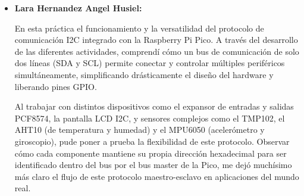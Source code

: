 \documentclass[letterpaper,12pt]{article}
\begin{document}
\begin{itemize}
        Al trabajar con distintos dispositivos como el expansor de entradas y salidas PCF8574 (actividad 2), la pantalla OLED SSD1306 (actividad 6), y el sensor de temperatura TMP102 (actividad 7), pude poner a prueba la flexibilidad de este protocolo. Observar como cada componente mantiene su propia direccion hexadecimal para ser identificado dentro del bus por el bus master de la Pico, me dejo muchisimo mas claro el flujo de este protocolo maestro-esclavo en aplicaciones del mundo real.

        \item \textbf{Lara Hernandez Angel Husiel:} 
        
        En esta práctica el funcionamiento y la versatilidad del protocolo de comunicación I2C integrado con la Raspberry Pi Pico. A través del desarrollo de las diferentes actividades, comprendí cómo un bus de comunicación de solo dos líneas (SDA y SCL) permite conectar y controlar múltiples periféricos simultáneamente, simplificando drásticamente el diseño del hardware y liberando pines GPIO.

        Al trabajar con distintos dispositivos como el expansor de entradas y salidas PCF8574, la pantalla LCD I2C, y sensores complejos como el TMP102, el AHT10 (de temperatura y humedad) y el MPU6050 (acelerómetro y giroscopio), pude poner a prueba la flexibilidad de este protocolo. Observar cómo cada componente mantiene su propia dirección hexadecimal para ser identificado dentro del bus por el bus master de la Pico, me dejó muchísimo más claro el flujo de este protocolo maestro-esclavo en aplicaciones del mundo real.
        
    \end{itemize}

    \newpage


    \nocite{*} 
    \printbibliography[heading=bibintoc, title={Referencias}]
\end{document}
